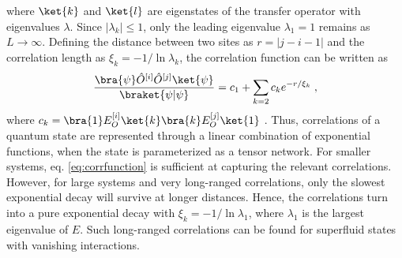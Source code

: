 where $\ket{k}$ and $\ket{l}$ are eigenstates of the transfer operator with eigenvalues $\lambda$. Since $|\lambda_k| \leq 1 $, only the leading eigenvalue $\lambda_1 = 1$ remains as $L \to \infty$. Defining the distance between two sites as $r = |j - i -1|$ and the correlation  length as $\xi_k = -1/\ln \lambda_k$, the correlation function can be written as
\begin{equation}
	\frac{\bra{\psi} \hat{O}^{[i]} \hat{O}^{[j]} \ket{\psi}}{\braket{\psi | \psi}} = c_1 + \sum_{k = 2} c_k e^{-r/ \xi_k} \; , \label{eq:corrfunction}
\end{equation}
where $c_k = \bra{1} E_{O}^{[i]} \ket{k} \bra{k} E_{O}^{[j]} \ket{1}$ \cite{schollwock}.
Thus, correlations of a quantum state are represented through a linear combination of exponential functions, when the state is parameterized as a tensor network. For smaller systems, eq. \eqref{eq:corrfunction} is sufficient at capturing the relevant correlations. However, for large systems and very long-ranged correlations, only the slowest exponential decay will survive at longer distances. Hence, the correlations turn into a pure exponential decay with $\xi_k = -1/\ln \lambda_1$, where $\lambda_1$ is the largest eigenvalue of $\hat{E}$. Such long-ranged correlations can be found for superfluid states with vanishing interactions.